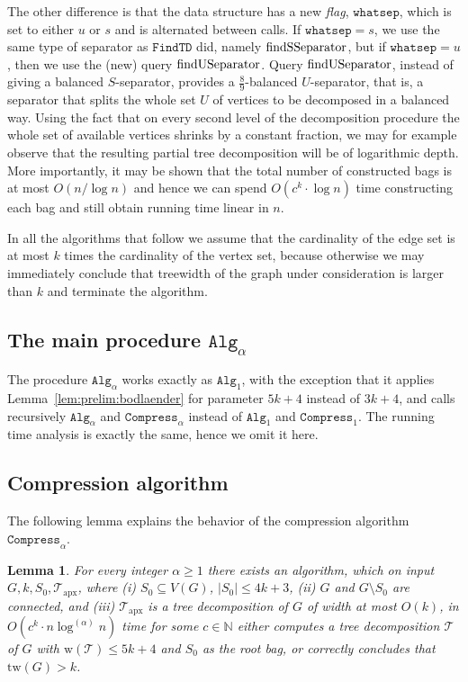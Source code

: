\documentclass[a4paper,11pt]{article}
\newtheorem{lemma}{Lemma}[section]
\theoremstyle{definition}
\theoremstyle{remark}
\newcommand{\depth}{\alpha}
\newcommand{\findTD}{\mathtt{FindTD}}
\newcommand{\whatsep}{\mathtt{whatsep}}
\newcommand{\compress}[1]{\mathtt{Compress}_{#1}}
\newcommand{\alg}[1]{\mathtt{Alg}_{#1}}
\newcommand{\qUsep}{\textnormal{findUSeparator}}
\newcommand{\qSsep}{\textnormal{findSSeparator}}
\newcommand{\td}{\mathcal{T}} \newcommand{\tw}{\mathrm{tw}} \newcommand{\w}{\mathrm{w}}
\newcommand{\apx}{\textrm{apx}}
\begin{document}
\begin{itemize}
  The other difference is that the data structure has a new
  \emph{flag}, $\whatsep$, which is set to either $u$ or $s$ and is
  alternated between calls.  If $\whatsep = s$, we use the same type
  of separator as $\findTD$ did, namely $\qSsep$, but if $\whatsep =
  u$, then we use the (new) query $\qUsep$.  Query $\qUsep$, instead
  of giving a balanced $S$-separator, provides a
  $\frac{8}{9}$-balanced $U$-separator, that is, a separator that
  splits the whole set $U$ of vertices to be decomposed in a balanced
  way.  Using the fact that on every second level of the decomposition
  procedure the whole set of available vertices shrinks by a constant
  fraction, we may for example observe that the resulting partial tree
  decomposition will be of logarithmic depth.  More importantly, it
  may be shown that the total number of constructed bags is at most
  $O(n / \log n)$ and hence we can spend $O(c^k\cdot \log n)$ time
  constructing each bag and still obtain running time linear in $n$.
\end{itemize}

In all the algorithms that follow we assume that the cardinality of
the edge set is at most $k$ times the cardinality of the vertex set,
because otherwise we may immediately conclude that treewidth of the
graph under consideration is larger than $k$ and terminate the
algorithm.

\subsection{The main procedure $\alg{\depth}$}

The procedure $\alg{\depth}$ works exactly as $\alg{1}$, with the
exception that it applies Lemma~\ref{lem:prelim:bodlaender} for
parameter $5k+4$ instead of $3k+4$, and calls recursively
$\alg{\depth}$ and $\compress{\depth}$ instead of $\alg{1}$ and
$\compress{1}$.  The running time analysis is exactly the same, hence
we omit it here.

\subsection{Compression algorithm}

The following lemma explains the behavior of the compression algorithm
$\compress{\depth}$.

\begin{lemma}
  \label{lemma:nlogin-compression}
  For every integer $\depth\geq 1$ there exists an algorithm, which on
  input $G,k,S_0,\td_\apx$, where (i) $S_0\subseteq V(G)$, $|S_0|\leq
  4k+3$, (ii) $G$ and $G\setminus S_0$ are connected, and (iii)
  $\td_\apx$ is a tree decomposition of $G$ of width at most $O(k)$,
  in $O(c^k\cdot n \log^{(\depth)} n)$ time for some $c \in
  \mathbb{N}$ either computes a tree decomposition $\td$ of $G$ with
  $\w(\td) \leq 5k+4$ and $S_0$ as the root bag, or correctly
  concludes that $\tw(G)>k$.
\end{lemma}
\end{document}
